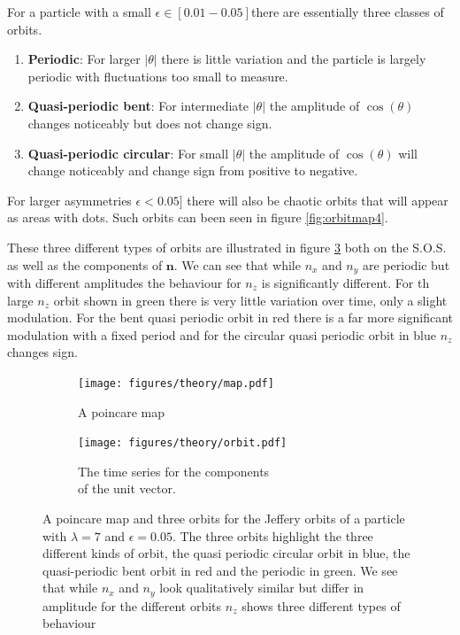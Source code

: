 For a particle with a small $\epsilon \in \left[0.01-0.05\right]$there are essentially three classes of orbits.

\begin{enumerate}
\item \textbf{Periodic}: For larger $\left|\theta\right|$ there is little variation and the particle is largely periodic with fluctuations too small to measure.
\item \textbf{Quasi-periodic bent}: For intermediate $\left|\theta\right|$ the amplitude of $\cos(\theta)$ changes noticeably but does not change sign.
\item \textbf{Quasi-periodic circular}: For small $\left|\theta\right|$ the amplitude of $\cos(\theta)$ will change noticeably and change sign from positive to negative.
\end{enumerate}

For larger asymmetries $\epsilon < 0.05]$ there will also be chaotic orbits that will appear as areas with dots. Such orbits can been seen in figure \ref{fig:orbitmap4}.

These three different types of orbits are illustrated in figure \ref{fig:orbittypes} both on the S.O.S. as well as the components of $\mathbf{n}$. We can see that while $n_x$ and $n_y$ are periodic but with different amplitudes the behaviour for $n_z$ is significantly different. For th large $n_z$ orbit shown in green there is very little variation over time, only a slight modulation. For the bent quasi periodic orbit in red there is a far more significant modulation with a fixed period and for the circular quasi periodic orbit in blue $n_z$ changes sign.

\begin{figure}[H]
\centering
\begin{subfigure}[3a]{0.40\textwidth}
\texttt{[image: figures/theory/map.pdf]}
\caption{A poincare map}\label{fig:orbitmap}
\end{subfigure}\hspace{1em}%
\begin{subfigure}[3b]{0.40\textwidth}
\texttt{[image: figures/theory/orbit.pdf]}
\caption{The time series for the components \\ of the unit vector.}\label{fig:orbitparams}
\end{subfigure}
\caption{A poincare map and three orbits for the Jeffery orbits of a particle with $\lambda=7$ and $\epsilon=0.05$. The three orbits highlight the three different kinds of orbit, the quasi periodic circular orbit in blue, the quasi-periodic bent orbit in red and the periodic in green. We see that while $n_x$ and $n_y$ look qualitatively similar but differ in amplitude for the different orbits $n_z$ shows three different types of behaviour}
\label{fig:orbittypes}
\end{figure}



